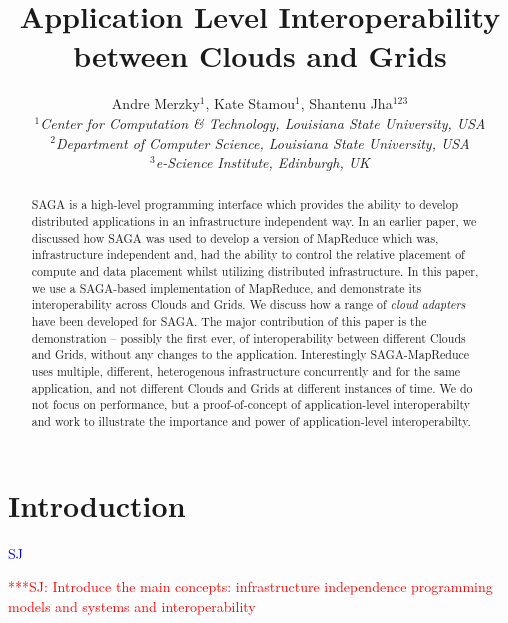 \documentclass[conference,final]{IEEEtran}
\title{Application Level Interoperability between Clouds and Grids}
\author{Andre Merzky$^{1}$,  Kate Stamou$^{1}$, Shantenu Jha$^{123}$\\
  \small{\emph{$^{1}$Center for Computation \& Technology, Louisiana
      State University, USA}}\\
  \small{\emph{$^{2}$Department of Computer Science, Louisiana State
      University, USA}}\\
  \small{\emph{$^{3}$e-Science Institute, Edinburgh, UK}}\\
}
\newcommand{\jhanote}[1]{ {\textcolor{red} { ***SJ: #1 }}}
\newcommand{\jhanote}[1]{}
\newcommand{\sagamapreduce }{SAGA-MapReduce }
\begin{document}
\maketitle

\begin{abstract}
  SAGA is a high-level programming interface which provides the
  ability to develop distributed applications in an infrastructure
  independent way. In an earlier paper, we discussed how SAGA was used
  to develop a version of MapReduce which was, infrastructure
  independent and, had the ability to control the relative placement
  of compute and data placement whilst utilizing distributed
  infrastructure. In this paper, we use a SAGA-based implementation of
  MapReduce, and demonstrate its interoperability across Clouds and
  Grids.  We discuss how a range of {\it cloud adapters} have been
  developed for SAGA.  The major contribution of this paper is the
  demonstration -- possibly the first ever, of interoperability
  between different Clouds and Grids, without any changes to the
  application. Interestingly \sagamapreduce uses multiple, different,
  heterogenous infrastructure concurrently and for the same
  application, and not different Clouds and Grids at different
  instances of time.  We do not focus on performance, but a
  proof-of-concept of application-level interoperabilty and work to
  illustrate the importance and power of application-level
  interoperabilty.
\end{abstract}

\section{Introduction} {\textcolor{blue} {SJ}}


\jhanote{Introduce the main concepts: infrastructure independence
  programming models and systems and interoperability}

\end{document}
